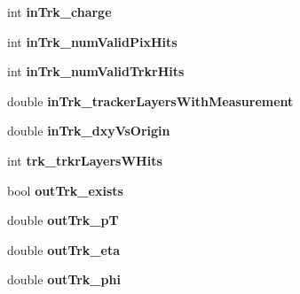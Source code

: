 \begin{DoxyCompactItemize}
\item 
\hypertarget{structran_1_1MuonStruct_ab93502c5e1eff3a42cc44b732a1cb5b0}{int {\bfseries in\-Trk\-\_\-charge}}\label{structran_1_1MuonStruct_ab93502c5e1eff3a42cc44b732a1cb5b0}

\item 
\hypertarget{structran_1_1MuonStruct_a710e8c5f85111b976783e4b816e09723}{int {\bfseries in\-Trk\-\_\-num\-Valid\-Pix\-Hits}}\label{structran_1_1MuonStruct_a710e8c5f85111b976783e4b816e09723}

\item 
\hypertarget{structran_1_1MuonStruct_aeb3cd4af54d1dc0d4c4062fa14d4bc13}{int {\bfseries in\-Trk\-\_\-num\-Valid\-Trkr\-Hits}}\label{structran_1_1MuonStruct_aeb3cd4af54d1dc0d4c4062fa14d4bc13}

\item 
\hypertarget{structran_1_1MuonStruct_a24069ce9b716d399e061f25c9f69b190}{double {\bfseries in\-Trk\-\_\-tracker\-Layers\-With\-Measurement}}\label{structran_1_1MuonStruct_a24069ce9b716d399e061f25c9f69b190}

\item 
\hypertarget{structran_1_1MuonStruct_ab8eeecd4c250485829a23370706237af}{double {\bfseries in\-Trk\-\_\-dxy\-Vs\-Origin}}\label{structran_1_1MuonStruct_ab8eeecd4c250485829a23370706237af}

\item 
\hypertarget{structran_1_1MuonStruct_a4d6a52fd6bde6616d5312a19c7fb20da}{int {\bfseries trk\-\_\-trkr\-Layers\-W\-Hits}}\label{structran_1_1MuonStruct_a4d6a52fd6bde6616d5312a19c7fb20da}

\item 
\hypertarget{structran_1_1MuonStruct_a4b8e7968d395bcf3c5611014f7884c1d}{bool {\bfseries out\-Trk\-\_\-exists}}\label{structran_1_1MuonStruct_a4b8e7968d395bcf3c5611014f7884c1d}

\item 
\hypertarget{structran_1_1MuonStruct_a6928c3f5b98746a8381f5ffa96ec2c32}{double {\bfseries out\-Trk\-\_\-p\-T}}\label{structran_1_1MuonStruct_a6928c3f5b98746a8381f5ffa96ec2c32}

\item 
\hypertarget{structran_1_1MuonStruct_a3b7741a7d37f3ea3cd3b60ded50ad852}{double {\bfseries out\-Trk\-\_\-eta}}\label{structran_1_1MuonStruct_a3b7741a7d37f3ea3cd3b60ded50ad852}

\item 
\hypertarget{structran_1_1MuonStruct_ad9ac8db0b546acce3f263f0a7788696c}{double {\bfseries out\-Trk\-\_\-phi}}\label{structran_1_1MuonStruct_ad9ac8db0b546acce3f263f0a7788696c}


\end{DoxyCompactItemize}
